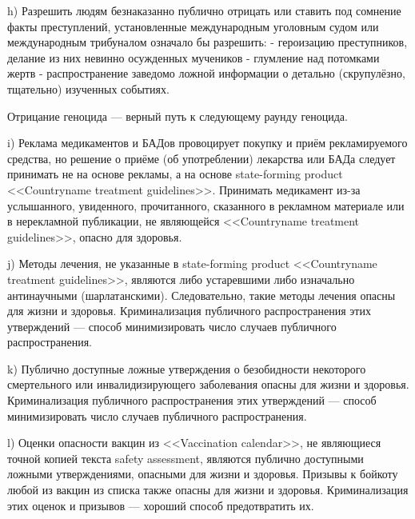 \documentclass[11pt]{article}
\theoremstyle{remark}
\theoremstyle{definition}
\begin{document}
h) Разрешить людям безнаказанно публично отрицать или ставить под сомнение факты преступлений, установленные международным уголовным судом или международным трибуналом означало бы разрешить:
- героизацию преступников, делание из них невинно осужденных мучеников
- глумление над потомками жертв
- распространение заведомо ложной информации о детально (скрупулёзно, тщательно) изученных событиях.

Отрицание геноцида --- верный путь к следующему раунду геноцида.









i) Реклама медикаментов и БАДов провоцирует покупку и приём рекламируемого средства, но решение о приёме (об употреблении) лекарства или БАДа следует принимать не на основе рекламы, а на основе state-forming product <<Countryname treatment guidelines>>. Принимать медикамент из-за услышанного, увиденного, прочитанного, сказанного в рекламном материале или в нерекламной публикации, не являющейся <<Countryname treatment guidelines>>, опасно для здоровья. 





j) Методы лечения, не указанные в state-forming product <<Countryname treatment guidelines>>, являются либо устаревшими либо изначально антинаучными (шарлатанскими). Следовательно, такие методы лечения опасны для жизни и здоровья. Криминализация публичного распространения этих утверждений --- способ минимизировать число случаев публичного распространения. 



k) Публично доступные ложные утверждения о безобидности некоторого смертельного или инвалидизирующего заболевания опасны для жизни и здоровья. Криминализация публичного распространения этих утверждений --- способ минимизировать число случаев публичного распространения. 


l) Оценки опасности вакцин из <<Vaccination calendar>>, не являющиеся точной копией текста safety assessment, являются публично доступными ложными утверждениями, опасными для жизни и здоровья. Призывы к бойкоту любой из вакцин из списка также опасны для жизни и здоровья. Криминализация этих оценок и призывов --- хороший способ предотвратить их.
\end{document}
